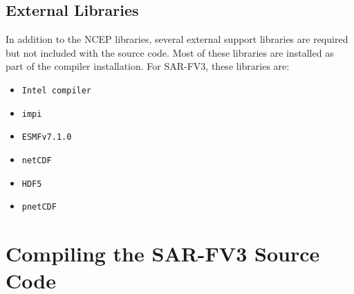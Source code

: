 \subsection{External Libraries}

In addition to the NCEP libraries, several external support libraries are required but not included with
the source code.  Most of these libraries are installed as part of the compiler installation.  For SAR-FV3, these
libraries are:

  \begin{itemize}
    \item \verb|Intel compiler|
    \item \verb|impi|
    \item \verb|ESMFv7.1.0|
    \item \verb|netCDF|
    \item \verb|HDF5|
    \item \verb|pnetCDF|
  \end{itemize}


\section{Compiling the SAR-FV3 Source Code}

